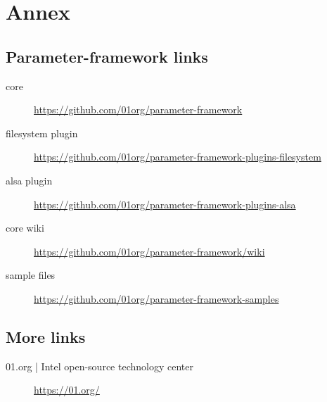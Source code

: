 \chapter*{Annex}\label{chap:annex}

\section*{Parameter-framework links}
\begin{description}
    \item[core] \url{https://github.com/01org/parameter-framework}
    \item[filesystem plugin] \url{https://github.com/01org/parameter-framework-plugins-filesystem}
    \item[alsa plugin] \url{https://github.com/01org/parameter-framework-plugins-alsa}
    \item[core wiki] \url{https://github.com/01org/parameter-framework/wiki}
    \item[sample files] \url{https://github.com/01org/parameter-framework-samples}
\end{description}

\section{More links}
\begin{description}
    \item[01.org | Intel open-source technology center] \url{https://01.org/}
\end{description}
